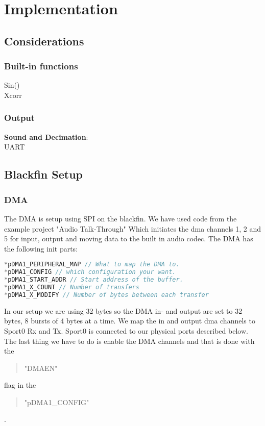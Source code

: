 \chapter{Implementation}
\section{Considerations}
\subsection{Built-in functions}
Sin()\\
Xcorr\\
\subsection{Output}
\textbf{Sound and Decimation}:\\

UART\\
\section{Blackfin Setup}
\subsection{DMA}
The DMA is setup using SPI on the blackfin. We have used code from the example project "Audio Talk-Through" Which initiates the dma channels 1, 2 and 5 for input, output and moving data to the built in audio codec. The DMA has the following init parts:
\begin{lstlisting}[language=C]
*pDMA1_PERIPHERAL_MAP // What to map the DMA to.
*pDMA1_CONFIG // which configuration your want.
*pDMA1_START_ADDR // Start address of the buffer.
*pDMA1_X_COUNT // Number of transfers
*pDMA1_X_MODIFY // Number of bytes between each transfer
\end{lstlisting}
In our setup we are using 32 bytes so the DMA in- and output are set to 32 bytes, 8 bursts of 4 bytes at a time. We map the in and output dma channels to Sport0 Rx and Tx. Sport0 is connected to our physical ports described below. The last thing we have to do is enable the DMA channels and that is done with the \begin{quote}
"DMAEN"
\end{quote}  flag in the 
\begin{quote}
"pDMA1\_CONFIG"
\end{quote}
.\\
